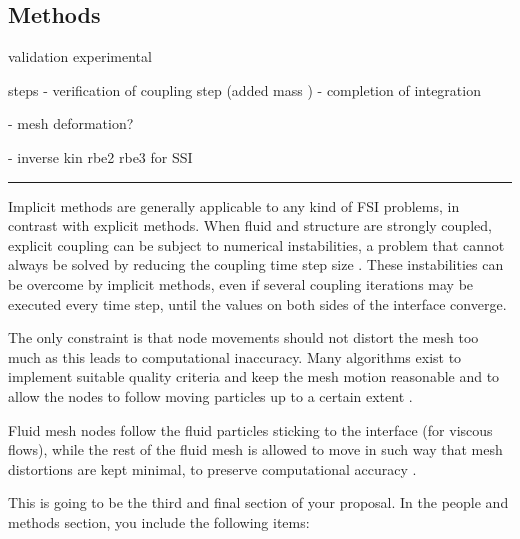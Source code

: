
\subsection*{Methods}


validation experimental \cite{heathcote2008effect}

steps
- verification of coupling step (added mass \cite{van2009added})
- completion of integration

- mesh deformation? \cite{de2007mesh}


- inverse kin rbe2 rbe3 for SSI


\noindent\rule{\textwidth}{1pt}










Implicit methods are generally applicable to any kind of FSI problems, in contrast with explicit methods. When fluid and structure are strongly coupled, explicit coupling can be subject to numerical instabilities, a problem that cannot always be solved by reducing the coupling time step size . These instabilities can be overcome by implicit methods, even if several coupling iterations may be executed every time step, until the values on both sides of the interface converge.

The only constraint is that node movements should not distort the mesh too much as this leads to computational inaccuracy. Many algorithms exist to implement suitable quality criteria and keep the mesh motion reasonable and to allow the nodes to follow moving particles up to a certain extent .

Fluid mesh nodes follow the fluid particles sticking to the interface (for viscous flows), while the rest of the fluid mesh is allowed to move in such way that mesh distortions are kept minimal, to preserve computational accuracy \cite{ramm1998fluid}.




This is going to be the third and final section of your proposal. In the people and methods section, you include the following items:

